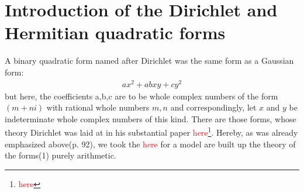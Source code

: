 \section{Introduction of the Dirichlet and Hermitian quadratic forms}
A binary quadratic form named after Dirichlet was the same form as a Gaussian form:
\begin{align}\label{eq:21}
ax^2+abxy+cy^2
\end{align}
but here, the coefficients a,b,c are to be whole complex numbers of the form $(m+ni)$ with rational whole numbers $m,n$ and correspondingly, let $x$ and $y$ be indeterminate whole complex numbers of this kind.
There are those forms, whose theory Dirichlet was laid at in his substantial paper \textcolor{red}{here}\footnote{\textcolor{red}{here}}. Hereby, as was already emphasized above(p. 92), we took the \textcolor{red}{here} for a model are built up the theory of the forms(1) purely arithmetic.

